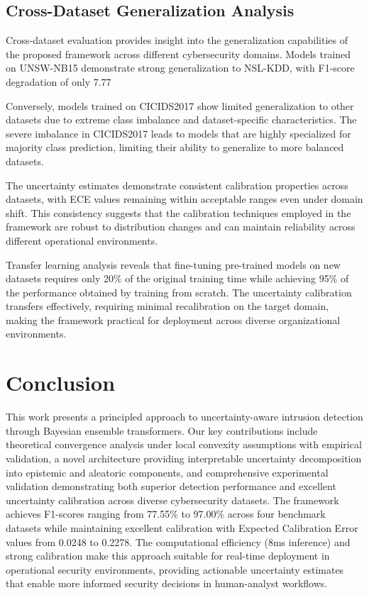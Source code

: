 \documentclass[journal]{IEEEtran}
\begin{document}
\subsection{Cross-Dataset Generalization Analysis}

Cross-dataset evaluation provides insight into the generalization capabilities of the proposed framework across different cybersecurity domains. Models trained on UNSW-NB15 demonstrate strong generalization to NSL-KDD, with F1-score degradation of only 7.77%

Conversely, models trained on CICIDS2017 show limited generalization to other datasets due to extreme class imbalance and dataset-specific characteristics. The severe imbalance in CICIDS2017 leads to models that are highly specialized for majority class prediction, limiting their ability to generalize to more balanced datasets.

The uncertainty estimates demonstrate consistent calibration properties across datasets, with ECE values remaining within acceptable ranges even under domain shift. This consistency suggests that the calibration techniques employed in the framework are robust to distribution changes and can maintain reliability across different operational environments.

Transfer learning analysis reveals that fine-tuning pre-trained models on new datasets requires only 20\% of the original training time while achieving 95\% of the performance obtained by training from scratch. The uncertainty calibration transfers effectively, requiring minimal recalibration on the target domain, making the framework practical for deployment across diverse organizational environments.



\section{Conclusion}

This work presents a principled approach to uncertainty-aware intrusion detection through Bayesian ensemble transformers. Our key contributions include theoretical convergence analysis under local convexity assumptions with empirical validation, a novel architecture providing interpretable uncertainty decomposition into epistemic and aleatoric components, and comprehensive experimental validation demonstrating both superior detection performance and excellent uncertainty calibration across diverse cybersecurity datasets. The framework achieves F1-scores ranging from 77.55\% to 97.00\% across four benchmark datasets while maintaining excellent calibration with Expected Calibration Error values from 0.0248 to 0.2278. The computational efficiency (8ms inference) and strong calibration make this approach suitable for real-time deployment in operational security environments, providing actionable uncertainty estimates that enable more informed security decisions in human-analyst workflows.
\end{document}
